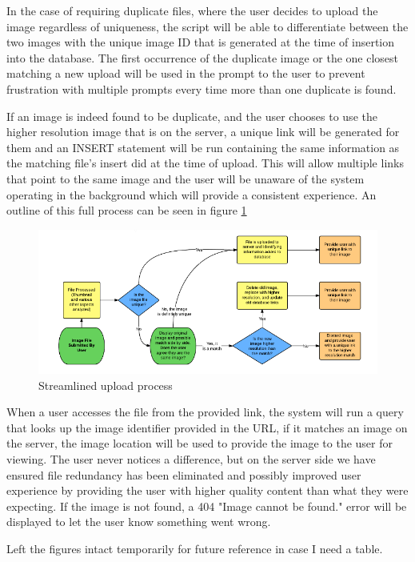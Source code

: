\documentclass[11pt]{article}
\begin{document}
In the case of requiring duplicate files, where the user decides to upload the image regardless of uniqueness, the script will be able to differentiate between the two images with the unique image ID that is generated at the time of insertion into the database. The first occurrence of the duplicate image or the one closest matching a new upload will be used in the prompt to the user to prevent frustration with multiple prompts every time more than one duplicate is found.

If an image is indeed found to be duplicate, and the user chooses to use the higher resolution image that is on the server, a unique link will be generated for them and an INSERT statement will be run containing the same information as the matching file's insert did at the time of upload. This will allow multiple links that point to the same image and the user will be unaware of the system operating in the background which will provide a consistent experience. An outline of this full process can be seen in figure \ref{method-fig1}

\begin{figure}[htbp]
\centering
\includegraphics[width=4.5in]{upprocess}
\caption{Streamlined upload process}
\label{method-fig1}
\end{figure}

When a user accesses the file from the provided link, the system will run a query that looks up the image identifier provided in the URL, if it matches an image on the server, the image location will be used to provide the image to the user for viewing. The user never notices a difference, but on the server side we have ensured file redundancy has been eliminated and possibly improved user experience by providing the user with higher quality content than what they were expecting. If the image is not found, a 404 "Image cannot be found." error will be displayed to let the user know something went wrong.

Left the figures intact temporarily for future reference in case I need a table.
\end{document}
